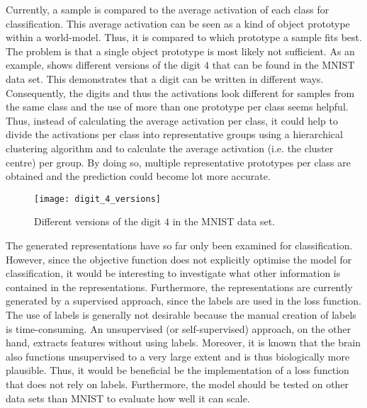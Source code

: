 Currently, a sample is compared to the average activation of each class for classification. This average activation can be seen as a kind of object prototype within a world-model. Thus, it is compared to which prototype a sample fits best. The problem is that a single object prototype is most likely not sufficient. As an example,  shows different versions of the digit $4$ that can be found in the MNIST data set. This demonstrates that a digit can be written in different ways. Consequently, the digits and thus the activations look different for samples from the same class and the use of more than one prototype per class seems helpful. Thus, instead of calculating the average activation per class, it could help to divide the activations per class into representative groups using a hierarchical clustering algorithm and to calculate the average activation (i.e. the cluster centre) per group. By doing so, multiple representative prototypes per class are obtained and the prediction could become lot more accurate.

\begin{figure}[h]
    \centering
    \texttt{[image: digit\_4\_versions]}
    \caption[Different versions of the digit $4$ in the MNIST data set]{Different versions of the digit $4$ in the MNIST data set.}
\end{figure}


The generated representations have so far only been examined for classification. However, since the objective function does not explicitly optimise the model for classification, it would be interesting to investigate what other information is contained in the representations. Furthermore, the representations are currently generated by a supervised approach, since the labels are used in the loss function. The use of labels is generally not desirable because the manual creation of labels is time-consuming. An unsupervised (or self-supervised) approach, on the other hand, extracts features without using labels. Moreover, it is known that the brain also functions unsupervised to a very large extent and is thus biologically more plausible.
Thus, it would be beneficial be the implementation of a loss function that does not rely on labels. Furthermore, the model should be tested on other data sets than MNIST to evaluate how well it can scale.

